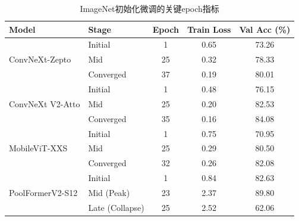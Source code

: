 \begin{table}[H]
    \centering
    \caption{ImageNet初始化微调的关键epoch指标}
    \label{tab:cp2_finetune_key_epochs_imagenet}
    \begin{tabular}{l l c c c}
        \toprule
        Model                             & Stage           & Epoch & Train Loss & Val Acc (\%) \\
        \midrule
        \multirow{3}{*}{ConvNeXt-Zepto}   & Initial         & 1     & 0.65       & 73.26        \\
                                          & Mid             & 25    & 0.32       & 78.33        \\
                                          & Converged       & 37    & 0.19       & 80.01        \\
        \midrule
        \multirow{3}{*}{ConvNeXt V2-Atto} & Initial         & 1     & 0.48       & 76.15        \\
                                          & Mid             & 25    & 0.20       & 82.53        \\
                                          & Converged       & 35    & 0.16       & 84.08        \\
        \midrule
        \multirow{3}{*}{MobileViT-XXS}    & Initial         & 1     & 0.75       & 70.95        \\
                                          & Mid             & 25    & 0.29       & 80.50        \\
                                          & Converged       & 32    & 0.26       & 82.08        \\
        \midrule
        \multirow{3}{*}{PoolFormerV2-S12} & Initial         & 1     & 0.84       & 82.63        \\
                                          & Mid (Peak)      & 23    & 2.37       & 89.80        \\
                                          & Late (Collapse) & 25    & 2.52       & 62.06        \\
        \bottomrule
    \end{tabular}
\end{table}

